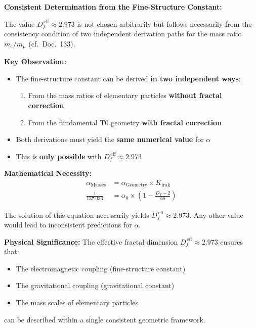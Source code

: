 	\begin{derivation}
		\textbf{Consistent Determination from the Fine-Structure Constant:}
		
		The value $D_f^{\,\text{eff}} \approx 2.973$ is not chosen arbitrarily but follows necessarily from the consistency condition of two independent derivation paths for the mass ratio $m_e/m_\mu$ (cf.\ Doc.~133).
		
		\textbf{Key Observation:}
		\begin{itemize}
			\item The fine-structure constant can be derived \textbf{in two independent ways}:
			\begin{enumerate}
				\item From the mass ratios of elementary particles \textbf{without fractal correction}
				\item From the fundamental T0 geometry \textbf{with fractal correction}
			\end{enumerate}
			\item Both derivations must yield the \textbf{same numerical value} for $\alpha$
			\item This is \textbf{only possible} with $D_f^{\,\text{eff}} \approx 2.973$
		\end{itemize}
		
		\textbf{Mathematical Necessity:}
		\begin{align}
			\alpha_{\text{Masses}} &= \alpha_{\text{Geometry}} \times K_{\text{frak}} \\
			\frac{1}{137.036} &= \alpha_0 \times \left(1 - \frac{D_f - 2}{68}\right)
		\end{align}
		
		The solution of this equation necessarily yields $D_f^{\,\text{eff}} \approx 2.973$. Any other value would lead to inconsistent predictions for $\alpha$.
		
		\textbf{Physical Significance:}
		The effective fractal dimension $D_f^{\,\text{eff}} \approx 2.973$ ensures that:
		\begin{itemize}
			\item The electromagnetic coupling (fine-structure constant)
			\item The gravitational coupling (gravitational constant)
			\item The mass scales of elementary particles
		\end{itemize}
		can be described within a single consistent geometric framework.
	\end{derivation}
	
